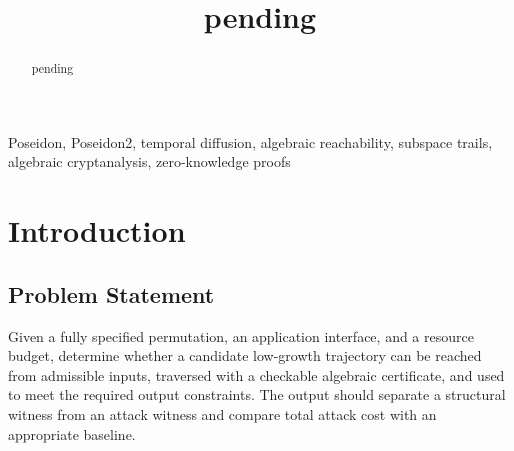 \documentclass[conference]{IEEEtran}
\theoremstyle{definition}
\theoremstyle{plain}
\begin{document}
\title{pending}

\author{
\and
{}
\and
{}
\and
{}
}

\maketitle

\begin{abstract}
pending
\end{abstract}
\begin{IEEEkeywords}
Poseidon, Poseidon2, temporal diffusion, algebraic reachability,
subspace trails, algebraic cryptanalysis, zero-knowledge proofs
\end{IEEEkeywords}

\section{Introduction}
\label{sec:introduction}

\subsection{Problem Statement}
Given a fully specified permutation, an application interface, and a
resource budget, determine whether a candidate low-growth trajectory
can be reached from admissible inputs, traversed with a checkable
algebraic certificate, and used to meet the required output constraints.
The output should separate a structural witness from an attack witness
and compare total attack cost with an appropriate baseline.
\end{document}
